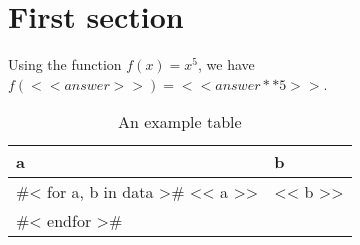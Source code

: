\documentclass{article}
\begin{document}
\section{First section}

Using the function $f(x) = x^5$, we have $f(<< answer >>) = << answer**5 >>$.

\begin{table}
\centering
\caption{An example table}
\begin{tabular}{l l}
\toprule
a & b \\
\midrule
#< for a, b in data >#
<< a >> & << b >> \\
#< endfor >#
\bottomrule
\end{tabular}
\end{table}
\end{document}
